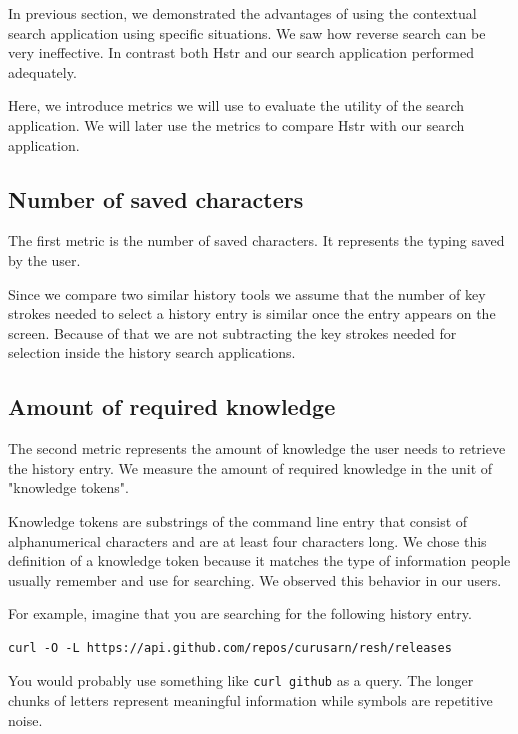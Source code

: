 In previous section, we demonstrated the advantages of using the contextual search application using specific situations. We saw how reverse search can be very ineffective. In contrast both Hstr and our search application performed adequately.

Here, we introduce metrics we will use to evaluate the utility of the search application. We will later use the metrics to compare Hstr with our search application. 

\subsection{Number of saved characters}

The first metric is the number of saved characters. It represents the typing saved by the user.

Since we compare two similar history tools we assume that the number of key strokes needed to select a history entry is similar once the entry appears on the screen. Because of that we are not subtracting the key strokes needed for selection inside the history search applications.

\subsection{Amount of required knowledge}

The second metric represents the amount of knowledge the user needs to retrieve the history entry. We measure the amount of required knowledge in the unit of "knowledge tokens".

Knowledge tokens are substrings of the command line entry that consist of alphanumerical characters and are at least four characters long. We chose this definition of a knowledge token because it matches the type of information people usually remember and use for searching. We observed this behavior in our users. 

For example, imagine that you are searching for the following history entry.

\begin{verbatim}
curl -O -L https://api.github.com/repos/curusarn/resh/releases  
\end{verbatim}

You would probably use something like \verb|curl github| as a query. The longer chunks of letters represent meaningful information while symbols are repetitive noise.





